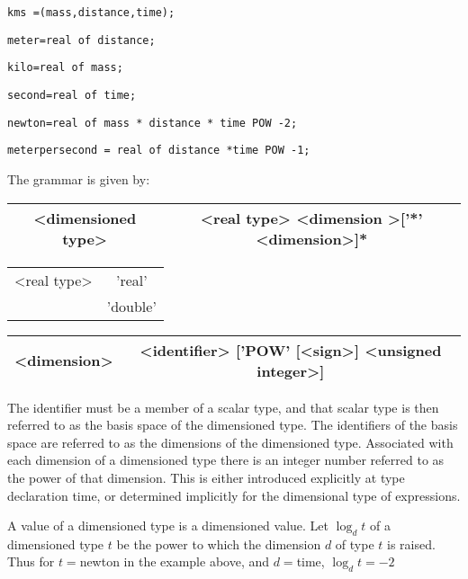 \texttt{kms =(mass,distance,time);}

\texttt{meter=real of distance;}

\texttt{kilo=real of mass;}

\texttt{second=real of time;}

\texttt{newton=real of mass {*} distance {*} time POW -2;}

\texttt{meterpersecond = real of distance {*}time POW -1;}

The grammar is given by:

\vspace{0.3cm}
{\centering \begin{tabular}{|c|c|}
\hline 
<dimensioned type>&
<real type> <dimension >{[}'{*}' <dimension>{]}{*}\\
\hline 
\end{tabular}\par}
\vspace{0.3cm}

\vspace{0.3cm}
{\centering \begin{tabular}{|c|c|}
\hline 
<real type>&
'real'\\
&
'double'\\
\hline 
\end{tabular}\par}
\vspace{0.3cm}

\vspace{0.3cm}
{\centering \begin{tabular}{|c|c|}
\hline 
<dimension>&
<identifier> {[}'POW' {[}<sign>{]} <unsigned integer>{]}\\
\hline 
\end{tabular}\par}
\vspace{0.3cm}

The identifier must be a member of a scalar type, and that
scalar type is then referred to as the basis space of the dimensioned type.
The identifiers of the basis space are referred to as the dimensions
of the dimensioned type. Associated with each dimension of a dimensioned
type there is an integer number referred to as the power of that dimension.
This is either introduced explicitly at type declaration time, or determined
implicitly for the dimensional type of expressions. 

A value of a dimensioned type is a dimensioned value. Let $ \log _{d}t $
of a dimensioned type $ t $ be the power to which the dimension $ d $
of type $ t $ is raised. Thus for $ t= $newton in the example above, and
$ d= $time, $ \log _{d}t=-2 $

